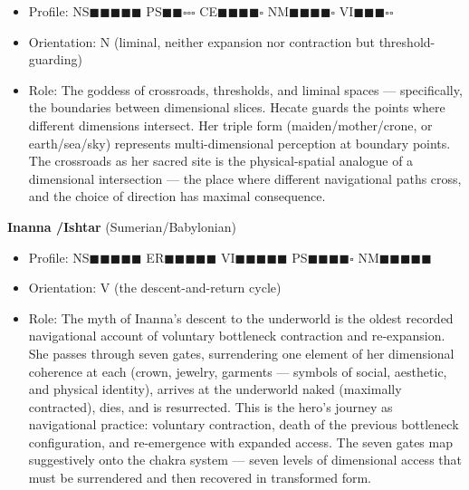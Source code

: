 \begin{itemize}[nosep,leftmargin=*]
  \item Profile: NS$\blacksquare$$\blacksquare$$\blacksquare$$\blacksquare$$\blacksquare$ PS$\blacksquare$$\blacksquare$$\square$$\square$$\square$ CE$\blacksquare$$\blacksquare$$\blacksquare$$\blacksquare$$\square$ NM$\blacksquare$$\blacksquare$$\blacksquare$$\blacksquare$$\square$ VI$\blacksquare$$\blacksquare$$\blacksquare$$\square$$\square$
  \item Orientation: N (liminal, neither expansion nor contraction but threshold-guarding)
  \item Role: The goddess of crossroads, thresholds, and liminal spaces — specifically, the boundaries between dimensional slices. Hecate guards the points where different dimensions intersect. Her triple form (maiden/\allowbreak mother/\allowbreak crone, or earth/\allowbreak sea/\allowbreak sky) represents multi-dimensional perception at boundary points. The crossroads as her sacred site is the physical-spatial analogue of a dimensional intersection — the place where different navigational paths cross, and the choice of direction has maximal consequence.
\end{itemize}


\textbf{Inanna /\allowbreak  Ishtar} (Sumerian/\allowbreak Babylonian)

\begin{itemize}[nosep,leftmargin=*]
  \item Profile: NS$\blacksquare$$\blacksquare$$\blacksquare$$\blacksquare$$\blacksquare$ ER$\blacksquare$$\blacksquare$$\blacksquare$$\blacksquare$$\blacksquare$ VI$\blacksquare$$\blacksquare$$\blacksquare$$\blacksquare$$\blacksquare$ PS$\blacksquare$$\blacksquare$$\blacksquare$$\blacksquare$$\square$ NM$\blacksquare$$\blacksquare$$\blacksquare$$\blacksquare$$\blacksquare$
  \item Orientation: V (the descent-and-return cycle)
  \item Role: The myth of Inanna's descent to the underworld is the oldest recorded navigational account of voluntary bottleneck contraction and re-expansion. She passes through seven gates, surrendering one element of her dimensional coherence at each (crown, jewelry, garments — symbols of social, aesthetic, and physical identity), arrives at the underworld naked (maximally contracted), dies, and is resurrected. This is the hero's journey as navigational practice: voluntary contraction, death of the previous bottleneck configuration, and re-emergence with expanded access. The seven gates map suggestively onto the chakra system — seven levels of dimensional access that must be surrendered and then recovered in transformed form.
\end{itemize}


